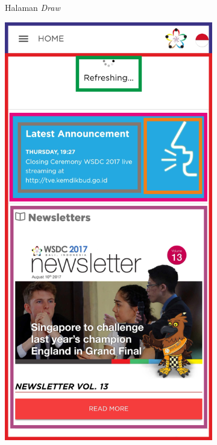 \begin{figure}[H]
\begin{subfigure}[b]{0.247\textwidth}
	    \caption{Halaman {\it Draw}}
	    \label{fig:drawPageWireframe}
     \end{subfigure}
     \hfill
     \begin{subfigure}[b]{0.247\textwidth}
         \centering
	    \includegraphics[scale=0.4]{Gambar/HomePageWireframe.png}

\end{subfigure}
\end{figure}
